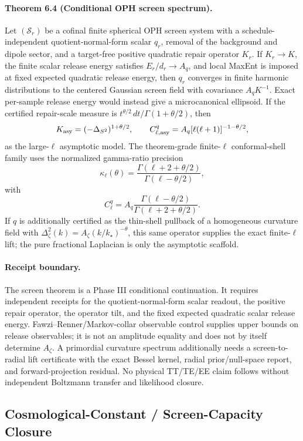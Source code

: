 \paragraph{\textbf{Theorem 6.4 (Conditional OPH screen spectrum).}}
Let \((\mathcal S_r)\) be a cofinal finite spherical OPH screen system with a schedule-independent
quotient-normal-form scalar \(q_r\), removal of the background and dipole sector, and a target-free
positive quadratic repair operator \(K_r\). If \(K_r\to K\), the finite scalar release energy
satisfies \(E_r/d_r\to A_q\), and local MaxEnt is imposed at fixed expected quadratic release
energy, then \(q_r\) converges in finite harmonic distributions to the centered Gaussian screen
field with covariance \(A_qK^{-1}\). Exact per-sample release energy would instead give a
microcanonical ellipsoid. If the certified repair-scale measure is
\(t^{\theta/2}\,dt/\Gamma(1+\theta/2)\), then
\[
K_{\rm asy}=(-\Delta_{S^2})^{1+\theta/2},
\qquad
C_{\ell,{\rm asy}}^q=A_q[\ell(\ell+1)]^{-1-\theta/2},
\]
as the large-\(\ell\) asymptotic model.  The theorem-grade finite-\(\ell\) conformal-shell family
uses the normalized gamma-ratio precision
\[
\kappa_\ell(\theta)=
\frac{\Gamma(\ell+2+\theta/2)}{\Gamma(\ell-\theta/2)},
\]
with
\[
C_\ell^q=A_q\frac{\Gamma(\ell-\theta/2)}{\Gamma(\ell+2+\theta/2)}.
\]
If \(q\) is additionally certified as the thin-shell pullback of a homogeneous curvature field with
\(\Delta_\zeta^2(k)=A_\zeta(k/k_\star)^{-\theta}\), this same operator supplies the exact
finite-\(\ell\) lift; the pure fractional Laplacian is only the asymptotic scaffold.

\paragraph{\textbf{Receipt boundary.}}
The screen theorem is a Phase III conditional continuation. It requires independent receipts for
the quotient-normal-form scalar readout, the positive repair operator, the operator tilt, and the
fixed expected quadratic scalar release energy. Fawzi--Renner/Markov-collar observable control supplies upper bounds on
release observables; it is not an amplitude equality and does not by itself determine
\(A_\zeta\). A primordial curvature spectrum additionally needs a screen-to-radial lift certificate
with the exact Bessel kernel, radial prior/null-space report, and forward-projection residual. No
physical TT/TE/EE claim follows without independent Boltzmann transfer and likelihood closure.

\subsection{Cosmological-Constant / Screen-Capacity Closure}

